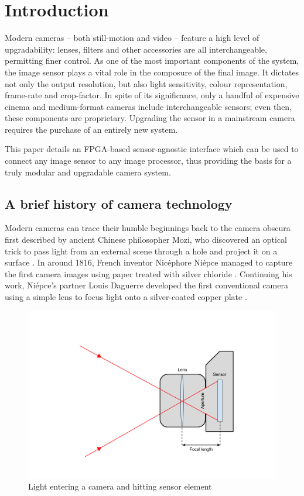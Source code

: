 \chapter{Introduction}

Modern cameras -- both still-motion and video -- feature a high level of upgradability: lenses, filters and other accessories are all interchangeable, permitting finer control. As one of the most important components of the system, the image sensor plays a vital role in the composure of the final image. It dictates not only the output resolution, but also light sensitivity, colour representation, frame-rate and crop-factor. In spite of its significance, only a handful of expensive cinema and medium-format cameras include interchangeable sensors; even then, these components are proprietary. Upgrading the sensor in a mainstream camera requires the purchase of an entirely new system.

This paper details an FPGA-based sensor-agnostic interface which can be used to connect any image sensor to any image processor, thus providing the basis for a truly modular and upgradable camera system.

\section{A brief history of camera technology}

Modern cameras can trace their humble beginnings back to the camera obscura first described by ancient Chinese philosopher Mozi, who discovered an optical trick to pass light from an external scene through a hole and project it on a surface \cite{1_woolfson_2012}. In around 1816, French inventor Nicéphore Niépce managed to capture the first camera images using paper treated with silver chloride \cite{2_stokstad_cateforis_addiss_2005}. Continuing his work, Niépce's partner Louis Daguerre developed the first conventional camera using a simple lens to focus light onto a silver-coated copper plate \cite{3_harvard_library_preservation}.

\begin{figure}
  \centering
  \includegraphics[width=1\textwidth]{./img/camera_physics_diagram.png}
  \caption{Light entering a camera and hitting sensor element}
  \label{fig:camera_physics_diagram}
\end{figure}


